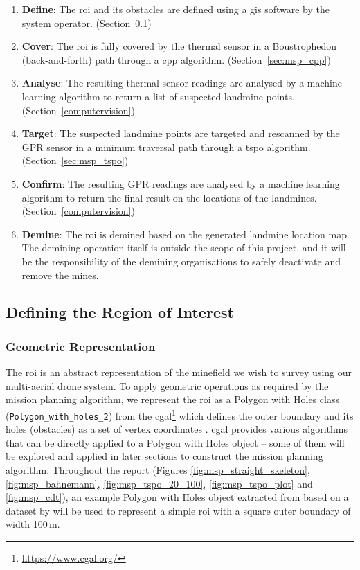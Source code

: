 \begin{enumerate}
    \item \textbf{Define}: The \gls{roi} and its obstacles are defined using a \gls{gis} software by the system operator. (Section~\ref{sec:msp_define})
    \item \textbf{Cover}: The \gls{roi} is fully covered by the thermal sensor in a Boustrophedon (back-and-forth) path through a \gls{cpp} algorithm. (Section~\ref{sec:msp_cpp})
    \item \textbf{Analyse}: The resulting thermal sensor readings are analysed by a machine learning algorithm to return a list of suspected landmine points. (Section~\ref{computervision}) 
    \item \textbf{Target}: The suspected landmine points are targeted and rescanned by the \gls{GPR} sensor in a minimum traversal path through a \gls{tspo} algorithm. (Section~\ref{sec:msp_tspo}) 
    \item \textbf{Confirm}: The resulting \gls{GPR} readings are analysed by a machine learning algorithm to return the final result on the locations of the landmines. (Section~\ref{computervision})
    \item \textbf{Demine}: The \gls{roi} is demined based on the generated landmine location map. The demining operation itself is outside the scope of this project, and it will be the responsibility of the demining organisations to safely deactivate and remove the mines.
\end{enumerate}


\subsection{Defining the Region of Interest}
\label{sec:msp_define}

\subsubsection{Geometric Representation}

The \gls{roi} is an abstract representation of the minefield we wish to survey using our multi-aerial drone system. To apply geometric operations as required by the mission planning algorithm, we represent the \gls{roi} as a Polygon with Holes class (\texttt{Polygon\_with\_holes\_2}) from the \gls{cgal}\footnote{\url{https://www.cgal.org/}} which defines the outer boundary and its holes (obstacles) as a set of vertex coordinates \cite{cgal2024pwh}. \gls{cgal} provides various algorithms that can be directly applied to a Polygon with Holes object -- some of them will be explored and applied in later sections to construct the mission planning algorithm. Throughout the report (Figures \ref{fig:msp_straight_skeleton}, \ref{fig:msp_bahnemann}, \ref{fig:msp_tspo_20_100}, \ref{fig:msp_tspo_plot} and \ref{fig:msp_cdt}), an example Polygon with Holes object extracted from \cite{bahnemann2021cpp} based on a dataset by \cite{sun2014dataset} will be used to represent a simple \gls{roi} with a square outer boundary of width 100\,m. 

